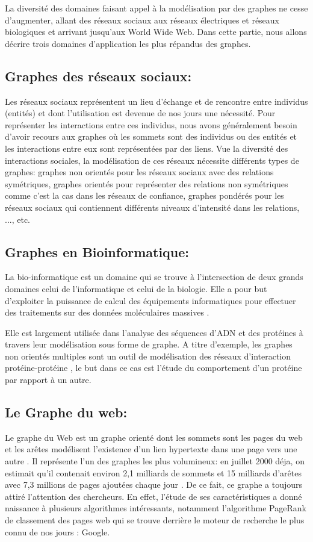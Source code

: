   La diversité des domaines faisant appel à la modélisation par des graphes ne cesse d'augmenter, allant des réseaux sociaux aux réseaux électriques et réseaux biologiques et arrivant jusqu'aux World Wide Web. Dans cette partie, nous allons décrire trois domaines d'application les plus répandus des graphes.
	
		\subsection{Graphes des réseaux sociaux:}
		Les réseaux sociaux représentent un lieu d'échange et de rencontre entre individus (entités) et dont l'utilisation est devenue de nos jours une nécessité.  
		Pour représenter les interactions entre ces individus, nous avons généralement besoin d'avoir recours aux graphes où les sommets sont des individus ou des entités et les interactions entre eux sont représentées par des liens. 
		Vue la diversité des interactions sociales, la modélisation de ces réseaux nécessite différents types de graphes: graphes non orientés pour les réseaux sociaux avec des relations  symétriques, graphes orientés pour représenter des relations non symétriques
comme c'est la cas dans les réseaux de confiance, graphes pondérés pour les réseaux sociaux qui contiennent différents niveaux d'intensité dans les relations, ..., etc. \citep{lemmouchi2012etude}
		
		\subsection{Graphes en Bioinformatique:}
		
		La bio-informatique est un domaine qui se trouve à l'intersection de deux grands domaines celui de l'informatique et celui de la biologie. Elle a pour but d'exploiter la puissance de calcul des équipements informatiques pour effectuer des traitements sur des données moléculaires massives \citep{pellegrini2004protein}.
		
		Elle est largement utilisée dans l’analyse des séquences d’ADN et des protéines à travers leur modélisation sous forme de graphe. A titre d'exemple, les graphes non orientés multiples sont un outil de modélisation des réseaux d’interaction protéine-protéine \citep{pellegrini2004protein}, 
		le but dans ce cas est l'étude du comportement d'un protéine par rapport à un autre.
		
		\subsection{Le Graphe du web:}
		 Le graphe du Web est un graphe orienté dont les sommets sont les pages du web et les arêtes modélisent l'existence d'un lien hypertexte dans une page vers une autre \citep{brisaboa2009k}. Il représente l'un des graphes les plus volumineux: en juillet 2000 déja, on estimait qu’il contenait environ 2,1 milliards de sommets et 15 milliards d’arêtes avec 7,3 millions de pages ajoutées chaque jour \citep{guillaume2002web}. De ce fait, ce graphe a toujours attiré l'attention des chercheurs. En effet, l'étude de ses caractéristiques a donné naissance à plusieurs algorithmes intéressants, notamment l'algorithme PageRank de classement des pages web qui se trouve derrière le moteur de recherche le plus connu de nos jours : Google.